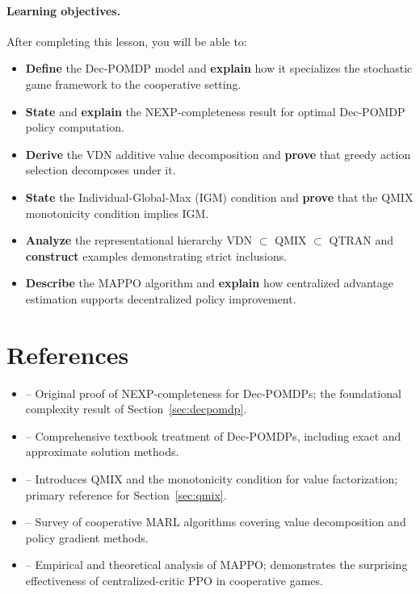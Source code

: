 \documentclass[11pt,a4paper]{article}
\begin{document}
\paragraph{Learning objectives.}
After completing this lesson, you will be able to:
\begin{itemize}[nosep]
  \item \textbf{Define} the Dec-POMDP model and \textbf{explain}
    how it specializes the stochastic game framework to the
    cooperative setting.
  \item \textbf{State} and \textbf{explain} the NEXP-completeness
    result for optimal Dec-POMDP policy computation.
  \item \textbf{Derive} the VDN additive value decomposition and
    \textbf{prove} that greedy action selection decomposes under it.
  \item \textbf{State} the Individual-Global-Max (IGM) condition
    and \textbf{prove} that the QMIX monotonicity condition implies
    IGM.
  \item \textbf{Analyze} the representational hierarchy
    VDN $\subset$ QMIX $\subset$ QTRAN and \textbf{construct}
    examples demonstrating strict inclusions.
  \item \textbf{Describe} the MAPPO algorithm and \textbf{explain}
    how centralized advantage estimation supports decentralized
    policy improvement.
\end{itemize}

\section{References}
\label{sec:references}

\begin{itemize}
  \item \citet{bernstein2002} -- Original proof of NEXP-completeness
    for Dec-POMDPs; the foundational complexity result of Section~\ref{sec:decpomdp}.
  \item \citet[Chapters 2--5]{oliehoek2016} -- Comprehensive textbook
    treatment of Dec-POMDPs, including exact and approximate solution
    methods.
  \item \citet{rashid2018} -- Introduces QMIX and the monotonicity
    condition for value factorization; primary reference for Section~\ref{sec:qmix}.
  \item \citet[Sections 4--5]{zhang2021} -- Survey of cooperative MARL
    algorithms covering value decomposition and policy gradient methods.
  \item \citet{yu2022} -- Empirical and theoretical analysis of MAPPO;
    demonstrates the surprising effectiveness of centralized-critic PPO
    in cooperative games.
\end{itemize}
\end{document}
